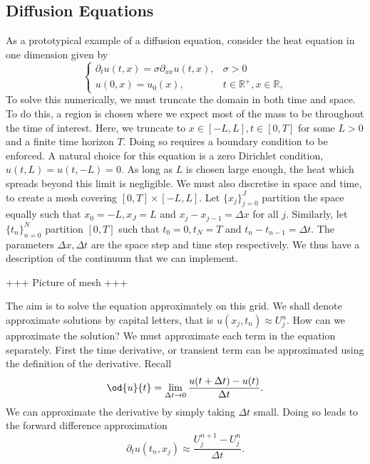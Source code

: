 \documentclass[11pt, a4pape draft]{article}
\renewcommand{\R}{\mathbb{R}}
\newcommand{\Dt}{\Delta t}
\begin{document}
        \subsection{Diffusion Equations}
        As a prototypical example of a diffusion equation, consider the heat equation in one dimension given by 
        \begin{equation}\begin{cases}
        \partial_t u(t,x) = \sigma\partial_{xx} u(t,x),&\sigma >0\\
        u(0,x) = u_0(x),  &t\in\R^+, x\in\R,
        \end{cases}\label{eq:heat}\end{equation}
        To solve this numerically, we must truncate the domain in both time and space. To do this, a region is chosen where we expect most of the mass to be throughout the time of interest. Here, we truncate to \(x \in [-L,L], t \in [0,T]\) for some \(L>0\) and a finite time horizon \(T\). Doing so requires a boundary condition to be enforced. A natural choice for this equation is a zero Dirichlet condition, \(u(t,L) = u(t,-L) = 0\). As long as \(L\) is chosen large enough, the heat which spreads beyond this limit is negligible. We must also discretise in space and time, to create a mesh covering \(\left[0,T\right] \times \left[-L,L\right]\). Let \(\lbrace x_j\rbrace_{j=0}^J\) partition the space equally such that \(x_0 = -L, x_J=L\) and \(x_j-x_{j-1} = \Delta x\) for all \(j\). Similarly, let \(\lbrace t_n\rbrace_{n=0}^N\) partition \(\left[0,T\right]\) such that \(t_0=0, t_N =T\) and \(t_n-t_{n-1} = \Delta t\). The parameters \(\Delta x, \Delta t\) are the space step and time step respectively. We thus have a description of the continuum that we can implement. 
        
        +++ Picture of mesh +++
        
        The aim is to solve the equation approximately on this grid. We shall denote approximate solutions by capital letters, that is \(u(x_j,t_n) \approx U_j^n\). How can we approximate the solution? We must approximate each term in the equation separately. First the time derivative, or transient term can be approximated using the definition of the derivative. Recall
        \[
        \od{u}{t} = \lim_{\Delta t \to 0}\frac{u(t+\Dt) - u(t)}{\Dt}.
        \]
        We can approximate the derivative by simply taking \(\Dt\) small. Doing so leads to the forward difference approximation
        \[
        \partial_t u(t_n,x_j) \approx \frac{U^{n+1}_j- U^n_j}{\Dt}.
        \]
        
\end{document}
